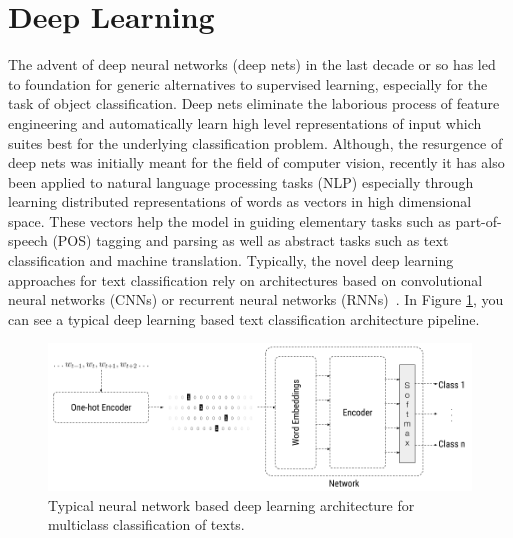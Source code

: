 \section{Deep Learning}
The advent of deep neural networks (deep nets) in the last decade or so has led to foundation for generic alternatives to supervised learning, especially for the task of object classification. Deep nets eliminate the laborious process of feature engineering and automatically learn high level representations of input which suites best for the underlying classification problem. Although, the resurgence of deep nets was initially meant for the field of computer vision, recently it has also been applied to natural language processing tasks (NLP)\cite{bengio2003neural, collobert2008unified, mikolov2013distributed} especially through learning distributed representations of words as vectors in high dimensional space. These vectors help the model in guiding elementary tasks such as part-of-speech (POS) tagging and parsing as well as abstract tasks such as text classification and machine translation. Typically, the novel deep learning approaches for text classification rely on architectures based on convolutional neural networks (CNNs) or recurrent neural networks (RNNs)~\cite{young2018recent}. In Figure \ref{fig:dlarch}, you can see a typical deep learning based text classification architecture pipeline.





\begin{figure}[!htb]
    \centering
    \includegraphics[scale=0.4]{Figures/text-classification-diagram.png}
    \caption{Typical neural network based deep learning architecture for multiclass classification of texts.}
    \label{fig:dlarch}
\end{figure}


